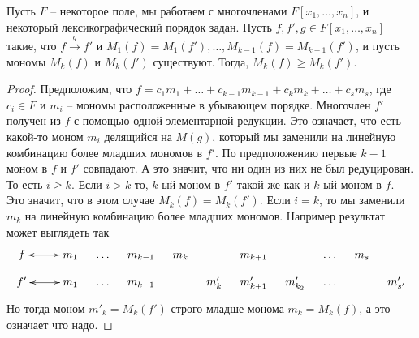 \begin{claim}
\label{claim::MkReduct}
Пусть $F$ -- некоторое поле, мы работаем с многочленами $F[x_1,\ldots,x_n]$, и некоторый лексикографический порядок задан.
Пусть $f, f',g\in F[x_1,\ldots,x_n]$ такие, что  $f\stackrel{g}{\longrightarrow}f'$ и $M_1(f) = M_1(f'), \ldots, M_{k-1}(f) = M_{k-1}(f')$, и пусть мономы $M_k(f)$ и $M_k(f')$ существуют.
Тогда, $M_k(f) \geqslant M_k(f')$.
\end{claim}
\begin{proof}
Предположим, что $f = c_1 m_1 + \ldots + c_{k-1} m_{k-1} + c_km_k +\ldots + c_s m_s$, где $c_i\in F$ и $m_i$ -- мономы расположенные в убывающем порядке.
Многочлен $f'$ получен из $f$ с помощью одной элементарной редукции.
Это означает, что есть какой-то моном $m_i$ делящийся на $M(g)$, который мы заменили на линейную комбинацию более младших мономов в $f'$.
По предположению первые $k-1$ моном в $f$ и $f'$ совпадают.
А это значит, что ни один из них не был редуцирован.
То есть $i\geqslant k$.
Если $i>k$ то, $k$-ый моном в $f'$ такой же как и $k$-ый моном в $f$.
Это значит, что в этом случае $M_k(f) = M_k(f')$.
Если $i = k$, то мы заменили $m_k$ на линейную комбинацию более младших мономов.
Например результат может выглядеть так
\[
\xymatrix@R=8pt@C=10pt{
	{f}\ar@{<->}[rr]&{}&{m_1}&{\ldots}&{m_{k-1}}&{m_k}&{}&{m_{k+1}}&{}&{\ldots}&{m_s}&{}\\
	{f'}\ar@{<->}[rr]&{}&{m_1}&{\ldots}&{m_{k-1}}&{}&{m'_k}&{m'_{k+1}}&{m'_{k_2}}&{\ldots}&{}&{m'_{s'}}\\
}
\]
Но тогда моном $m'_k = M_k(f')$ строго младше монома $m_k = M_k(f)$, а это означает что надо.
\end{proof}

